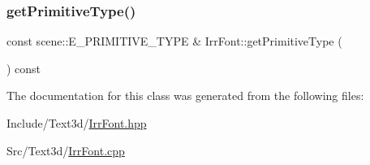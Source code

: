 \mbox{\label{class_irr_font_a5491c92f427cf8c87daee2a416bc2cd9}} 
\subsubsection{\texorpdfstring{getPrimitiveType()}{getPrimitiveType()}}
{\footnotesize\ttfamily const scene\+::\+E\+\_\+\+P\+R\+I\+M\+I\+T\+I\+V\+E\+\_\+\+T\+Y\+PE \& Irr\+Font\+::get\+Primitive\+Type (\begin{DoxyParamCaption}{ }\end{DoxyParamCaption}) const}



The documentation for this class was generated from the following files\+:\begin{DoxyCompactItemize}
\item 
Include/\+Text3d/\mbox{\hyperlink{_irr_font_8hpp}{Irr\+Font.\+hpp}}\item 
Src/\+Text3d/\mbox{\hyperlink{_irr_font_8cpp}{Irr\+Font.\+cpp}}\end{DoxyCompactItemize}

